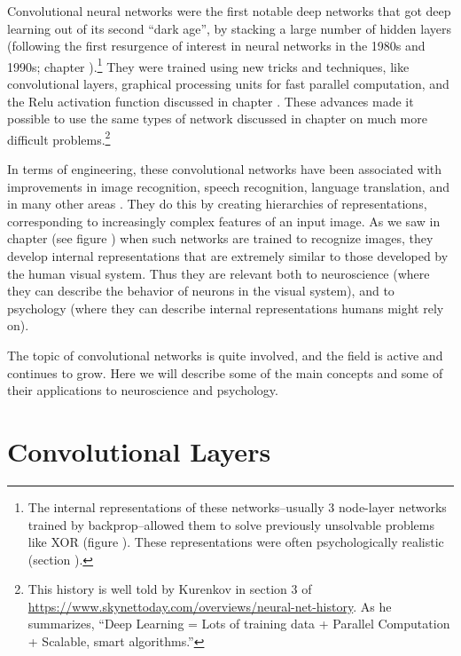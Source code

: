 Convolutional neural networks were the first notable deep networks that got deep learning out of its second ``dark age'', by stacking a large number of hidden layers (following the first resurgence of interest in neural networks in the 1980s and 1990s; chapter ).\footnote{The internal representations of these networks--usually 3 node-layer networks trained by backprop--allowed them to solve previously unsolvable problems like XOR (figure ). These representations were often psychologically realistic (section ).} They were trained using new tricks and techniques, like convolutional layers, graphical processing units for fast parallel computation, and the Relu activation function discussed in chapter . These advances made it possible to use the same types of network discussed in chapter  on much more difficult problems.\footnote{This history is well told by Kurenkov in section 3 of \url{https://www.skynettoday.com/overviews/neural-net-history}. As he summarizes, ``Deep Learning = Lots of training data + Parallel Computation + Scalable, smart algorithms.''}

In terms of engineering, these convolutional networks have been associated with improvements in image recognition, speech recognition, language translation, and in many other areas \cite{lecun2015deep, goodfellow2016deep}. They do this by creating hierarchies of representations, corresponding  to increasingly complex features of an input image. As we saw in chapter  (see figure ) when such networks are trained to recognize images, they develop internal representations that are extremely similar to those developed by the human visual  system. Thus they are relevant both to neuroscience (where they can describe the behavior of neurons in the visual system), and to psychology (where they can describe internal representations humans might rely on).

The topic of convolutional networks is quite involved, and the field is active and continues to grow. Here we will describe some of the main concepts and some of their applications to neuroscience and psychology.

\section{Convolutional Layers}\label{convolutionalLayer}

